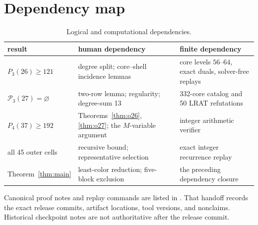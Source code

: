 \documentclass[11pt,reqno,a4paper]{amsart}
\theoremstyle{definition}
\theoremstyle{remark}
\newcommand{\cP}{\mathcal P}
\begin{document}
\appendix
\section{Dependency map}\label{app:dependencies}

\begin{table}[ht]
\centering
\caption{Logical and computational dependencies.}
\footnotesize
\begin{tabular}{@{}L{3.25cm} L{4.7cm} L{3.7cm}@{}}
\toprule
result&human dependency&finite dependency\\
\midrule
$P_3(26)\ge121$&degree split; core--shell incidence lemmas&
core levels $56$--$64$, exact duals, solver-free replays\\
$\cP_3(27)=\varnothing$&two-row lemma; regularity; degree-sum 13&
332-core catalog and 50 LRAT refutations\\
\addlinespace[0.3em]
$P_4(37)\ge192$&Theorems~\ref{thm:o26}, \ref{thm:o27};
the $M$-variable argument&integer arithmetic verifier\\
all 45 outer cells&recursive bound; representative selection&
exact integer recurrence replay\\
Theorem~\ref{thm:main}&least-color reduction; five-block exclusion&
the preceding dependency closure\\
\bottomrule
\end{tabular}
\end{table}

Canonical proof notes and replay commands are listed in
. That handoff records
the exact release commits, artifact locations, tool versions, and
nonclaims. Historical checkpoint notes are not authoritative after the
release commit.

\enlargethispage{10\baselineskip}
\begingroup
\footnotesize


\endgroup
\end{document}
